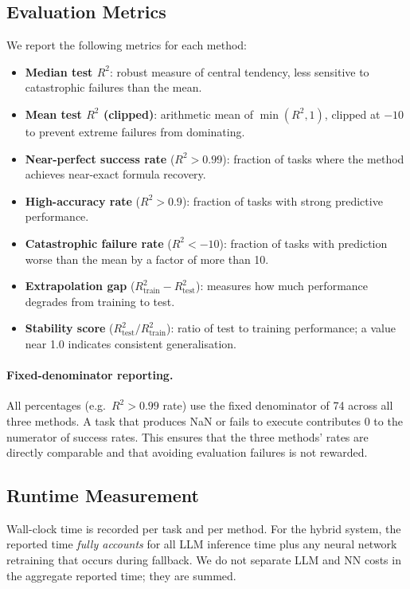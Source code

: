 \documentclass[twoside,11pt]{article}
\newcommand{\Rsq}{R^{2}}
\newcommand{\Rtrain}{R^{2}_{\mathrm{train}}}
\newcommand{\Rtest}{R^{2}_{\mathrm{test}}}
\begin{document}
\subsection{Evaluation Metrics}

We report the following metrics for each method:
\begin{itemize}
  \item \textbf{Median test $\Rsq$}: robust measure of central tendency, less
    sensitive to catastrophic failures than the mean.
  \item \textbf{Mean test $\Rsq$ (clipped)}: arithmetic mean of $\min(\Rsq, 1)$,
    clipped at $-10$ to prevent extreme failures from dominating.
  \item \textbf{Near-perfect success rate} ($\Rsq > 0.99$): fraction of tasks where
    the method achieves near-exact formula recovery.
  \item \textbf{High-accuracy rate} ($\Rsq > 0.9$): fraction of tasks with strong
    predictive performance.
  \item \textbf{Catastrophic failure rate} ($\Rsq < -10$): fraction of tasks with
    prediction worse than the mean by a factor of more than 10.
  \item \textbf{Extrapolation gap} ($\Rtrain - \Rtest$): measures how much
    performance degrades from training to test.
  \item \textbf{Stability score} ($\Rtest / \Rtrain$): ratio of test to training
    performance; a value near 1.0 indicates consistent generalisation.
\end{itemize}

\paragraph{Fixed-denominator reporting.}
All percentages (e.g.\ $\Rsq > 0.99$ rate) use the fixed denominator of 74 across
all three methods.  A task that produces NaN or fails to execute contributes 0 to
the numerator of success rates.  This ensures that the three methods' rates are
directly comparable and that avoiding evaluation failures is not rewarded.

\subsection{Runtime Measurement}
\label{sec:timing_setup}

Wall-clock time is recorded per task and per method.  For the hybrid system,
the reported time \emph{fully accounts} for all LLM inference time plus any
neural network retraining that occurs during fallback.  We do not separate
LLM and NN costs in the aggregate reported time; they are summed.
\end{document}
